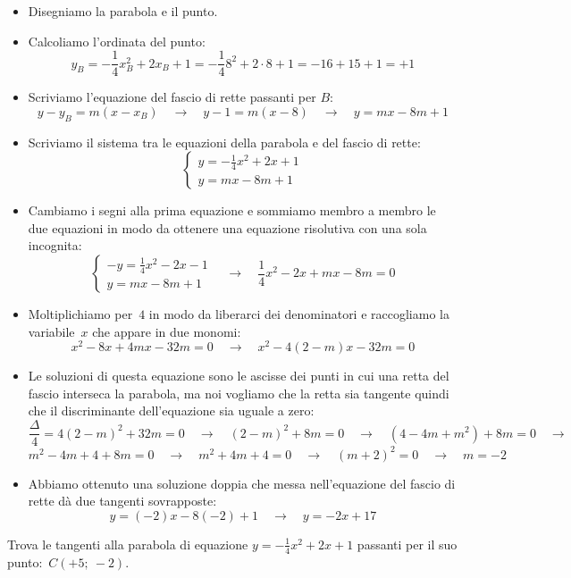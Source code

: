 \begin{exrig}
\begin{esempio}
 \begin{itemize}
  \item Disegniamo la parabola e il punto.
  \item Calcoliamo l'ordinata del punto:
\[y_B=-\frac{1}{4}x_B^2+2x_B+1=-\frac{1}{4}8^2+2 \cdot 8+1= -16+15+1=+1\]
  \item Scriviamo l'equazione del fascio di rette passanti per $B$:
\[y-y_B = m(x-x_B) \quad \rightarrow \quad 
y-1 = m\left(x-8\right)
\quad \rightarrow \quad y=mx-8m+1\]
  \item Scriviamo il sistema tra le equazioni della parabola e del fascio di 
   rette:
\[\left\{\begin{array}{l}
  y=-\frac{1}{4}x^2+2x +1\\
  y=mx-8m+1
\end{array}\right. \]
  \item Cambiamo i segni alla prima equazione e sommiamo membro a membro le
   due equazioni in modo da ottenere una equazione risolutiva con una sola 
   incognita:
\[\left\{\begin{array}{l}
  -y=\frac{1}{4}x^2-2x-1\\
  y=mx-8m+1
\end{array}\right. \quad \rightarrow \quad 
\frac{1}{4}x^2-2x+mx-8m=0\]
  \item Moltiplichiamo per~$4$ in modo da liberarci dei denominatori e 
   raccogliamo la variabile~$x$ che appare in due monomi:
\[x^2-8x+4mx-32m=0 \quad \rightarrow \quad x^2-4(2-m)x-32m=0\]
  \item Le soluzioni di questa equazione sono le ascisse dei punti in cui una 
   retta del fascio interseca la parabola, ma noi vogliamo che la retta sia
   tangente quindi che il discriminante dell'equazione sia uguale a zero:
\[\frac{\Delta}{4}=4(2-m)^2+32m=0 \quad \rightarrow \quad 
(2-m)^2+8m=0 \quad \rightarrow \quad
(4-4m+m^2)+8m=0 \quad \rightarrow \quad\]
\[m^2-4m+4+8m=0 \quad \rightarrow \quad
m^2+4m+4=0 \quad \rightarrow \quad
(m+2)^2=0  \quad \rightarrow \quad m=-2\]
  \item Abbiamo ottenuto una soluzione doppia che messa nell'equazione del 
   fascio di rette dà due tangenti sovrapposte:
\[y=(-2)x-8(-2)+1 \quad \rightarrow \quad y=-2x+17\]
 \end{itemize}
\end{esempio}

\begin{esempio}
 Trova le tangenti alla parabola di equazione $y=-\frac{1}{4}x^2+2x +1$ 
 passanti per il suo punto:~$C(+5;~-2)$.
 

\end{esempio}
\end{exrig}
